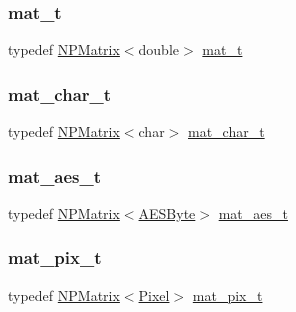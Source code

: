 \subsubsection{\texorpdfstring{mat\_t}{mat\_t}}
{\footnotesize\ttfamily typedef \mbox{\hyperlink{class_n_p_matrix}{N\+P\+Matrix}}$<$double$>$ \mbox{\hyperlink{group___n_algebra_ga44dfb60c1e03b44e98a332fb2ae71947}{mat\+\_\+t}}}

\mbox{\label{group___n_algebra_ga8904016e562c4e316f7bcff635bebd4a}} 
\subsubsection{\texorpdfstring{mat\_char\_t}{mat\_char\_t}}
{\footnotesize\ttfamily typedef \mbox{\hyperlink{class_n_p_matrix}{N\+P\+Matrix}}$<$char$>$ \mbox{\hyperlink{group___n_algebra_ga8904016e562c4e316f7bcff635bebd4a}{mat\+\_\+char\+\_\+t}}}

\mbox{\label{group___n_algebra_gac6131d6d5225e82316dde948e5314ede}} 
\subsubsection{\texorpdfstring{mat\_aes\_t}{mat\_aes\_t}}
{\footnotesize\ttfamily typedef \mbox{\hyperlink{class_n_p_matrix}{N\+P\+Matrix}}$<$\mbox{\hyperlink{class_a_e_s_byte}{A\+E\+S\+Byte}}$>$ \mbox{\hyperlink{group___n_algebra_gac6131d6d5225e82316dde948e5314ede}{mat\+\_\+aes\+\_\+t}}}

\mbox{\label{group___n_algebra_ga173b3bd738ed7a0a509c8d6f9ad65c5b}} 
\subsubsection{\texorpdfstring{mat\_pix\_t}{mat\_pix\_t}}
{\footnotesize\ttfamily typedef \mbox{\hyperlink{class_n_p_matrix}{N\+P\+Matrix}}$<$\mbox{\hyperlink{class_pixel}{Pixel}}$>$ \mbox{\hyperlink{group___n_algebra_ga173b3bd738ed7a0a509c8d6f9ad65c5b}{mat\+\_\+pix\+\_\+t}}}

\mbox{\label{group___n_algebra_ga0a2cfc67e738a3d73e4f12098c4c07f6}} 

